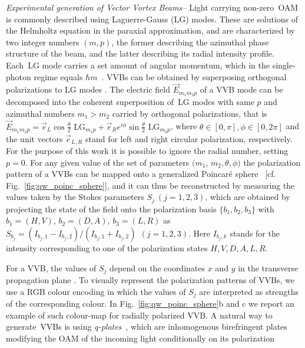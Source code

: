 \textit{Experimental generation of Vector Vortex Beams--} 
Light carrying non-zero~\ac{OAM} is commonly described using Laguerre-Gauss (\ac{LG}) modes.
These are solutions of the Helmholtz equation in the paraxial approximation, and are characterized by two integer numbers $(m, p)$, the former describing the azimuthal phase structure of the beam, and the latter describing its radial intensity profile.
Each~\ac{LG} mode carries a set amount of angular momentum, which in the single-photon regime equals $\hbar m$~\cite{allen1992orbital}.
\acp{VVB} can be obtained by superposing orthogonal polarizations to \ac{LG} modes \cite{padgett2004lights}. 
The electric field $\Vec{E}_{m_1m_2p}$ of a \ac{VVB} mode can be decomposed into the coherent superposition of~\ac{LG} modes with same $p$ and azimuthal numbers $m_1>m_2$ carried by orthogonal polarizations, that is
$    \Vec{E}_{m_1m_2p}=\Vec{e}_L \cos{ \frac{\theta}{2}}\text{ LG$_{m_1p}$} +\Vec{e}_R e^{i \phi} \sin{ \frac{\theta}{2}}\text{ LG$_{m_2p}$}$,
where $\theta\in[0,\pi], \phi\in[0,2\pi]$ and the unit vectors $\Vec{e}_{L,R}$ stand for left and right circular polarization, respectively.
For the purpose of this work it is possible to ignore the radial number, setting $p=0$. For any given value of the set of parameters $(m_1$, $m_2, \theta, \phi)$  the polarization pattern of a \acp{VVB} can be mapped onto a generalized Poincar\'e sphere~\cite{milione2011higherorder} [cf. Fig.~\ref{fig:qw_poinc_sphere}], and 
it can thus be reconstructed by measuring the values taken by the Stokes parameters $S_{j}~(j=1,2,3)$, which are obtained by projecting the state of the field onto the polarization basis $\{b_1,b_2,b_3\}$ with $b_1=( H,V )$, $b_2=( D,A )$, $b_3=( L,R )$ as 
    $    S_{b_j}=(I_{b_j,1}-I_{b_j,2})/(I_{b_j,1}+I_{b_j,2})~~(j=1,2,3)$.
Here $I_{b_j,k}$ stands for the intensity corresponding to one of the polarization states $H,V,D,A,L,R$.

For a \ac{VVB}, the values of $S_j$ depend on the coordinates $x$ and $y$ in the transverse propagation plane \cite{cardano2012polarization}.
To visually represent the polarization patterns of \acp{VVB}, we use a RGB colour encoding in which the values of $S_j$ are interpreted as strengths of the corresponding colour. In Fig.~\ref{fig:qw_poinc_sphere}b and c we report an example of such colour-map for radially polarized \ac{VVB}. A natural way to generate~\acp{VVB} is using \emph{q-plates}~\cite{marrucci2006optical,cardano2012polarization}, which are inhomogenous birefringent plates modifying the OAM of the incoming light conditionally on its polarization 



